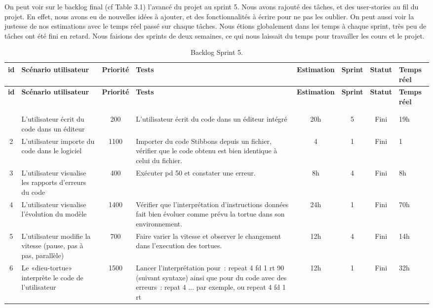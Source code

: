 On peut voir sur le backlog final (cf Table 3.1) l'avancé du projet au sprint 5.
Nous avons rajouté des tâches, et des user-stories au fil du projet. En effet, nous avons eu de nouvelles idées à ajouter, et des fonctionnalités à écrire pour ne pas les oublier.
On peut aussi voir la justesse de nos estimations avec le temps réel passé sur chaque tâches.
Nous étions globalement dans les temps à chaque sprint, très peu de tâches ont été fini en retard.
Nous faisions des sprints de deux semaines, ce qui nous laissait du temps pour travailler les cours et le projet.

{\tiny
\begin{longtable}[c]{|c|p{1.3cm}|c|p{3.5cm}|*{3}{c|}p{0.7cm}|}
\hline
\bf id & \bf Scénario utilisateur & \bf Priorité & \bf Tests & \bf Estimation & \bf Sprint & \bf Statut & \bf Temps réel \\
\hline
\endfirsthead
\hline
\bf id & \bf Scénario utilisateur & \bf Priorité & \bf Tests & \bf Estimation & \bf Sprint & \bf Statut & \bf Temps réel \\
\hline
\endhead
\hline
\caption{Backlog Sprint 5 (fin).} \label{bsp5}\\
\endlastfoot
\hline
\caption[]{Backlog Sprint 5.}\\
\endfoot
1 & L'utilisateur écrit du code dans un éditeur & 200 & L'utilisateur écrit du code dans un éditeur intégré & 20h & 5 & Fini & 19h \\
\hline
2 & L'utilisateur importe du code dans le logiciel & 1100 & Importer du code Stibbons depuis un fichier, vérifier que le code obtenu est bien identique à celui du fichier. & 4 & 1 & Fini & 1 \\
\hline
3 & L'utilisateur visualise les rapports d'erreurs du code & 400 & Exécuter pd 50 et constater une erreur. & 8h & 4 & Fini & 8h \\
\hline
4 & L'utilisateur visualise l'évolution du modèle & 1400 & Vérifier que l'interprétation d'instructions données fait bien évoluer comme prévu la tortue dans son environnement. & 24h & 1 & Fini & 70h \\
\hline
5 & L'utilisateur modifie la vitesse (pause, pas à pas, parallèle) & 700 & Faire varier la vitesse et observer le changement dans l'execution des tortues. & 12h & 4 & Fini & 14h \\
\hline
6 & Le «dieu-tortue» interprète le code de l'utilisateur & 1500 & Lancer l'interprétation pour~: repeat 4 { fd 1 rt 90 } (suivant syntaxe) ainsi que pour du code avec des erreurs~: repat 4 {...} par exemple, ou repeat 4 { fd 1 rt } & 12h & 1 & Fini & 32h \\

\end{longtable}}
